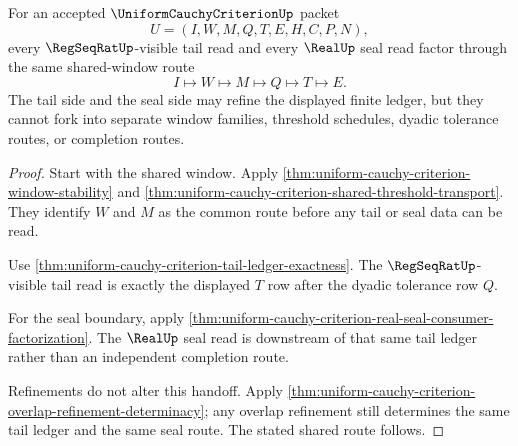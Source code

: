 \begin{theorem}
\label{thm:uniform-cauchy-criterion-finite-family-regseq-real-handoff}
For an accepted $\UniformCauchyCriterionUp$ packet
$$
U=(I,W,M,Q,T,E,H,C,P,N),
$$
every $\RegSeqRatUp$-visible tail read and every $\RealUp$ seal read factor through the same shared-window route
$$
I \longmapsto W \longmapsto M \longmapsto Q \longmapsto T \longmapsto E.
$$
The tail side and the seal side may refine the displayed finite ledger, but they cannot fork into separate window families, threshold schedules, dyadic tolerance routes, or completion routes.
\end{theorem}
\begin{proof}
Start with the shared window. Apply \autoref{thm:uniform-cauchy-criterion-window-stability} and \autoref{thm:uniform-cauchy-criterion-shared-threshold-transport}. They identify $W$ and $M$ as the common route before any tail or seal data can be read.

Use \autoref{thm:uniform-cauchy-criterion-tail-ledger-exactness}. The $\RegSeqRatUp$-visible tail read is exactly the displayed $T$ row after the dyadic tolerance row $Q$.

For the seal boundary, apply \autoref{thm:uniform-cauchy-criterion-real-seal-consumer-factorization}. The $\RealUp$ seal read is downstream of that same tail ledger rather than an independent completion route.

Refinements do not alter this handoff. Apply \autoref{thm:uniform-cauchy-criterion-overlap-refinement-determinacy}; any overlap refinement still determines the same tail ledger and the same seal route. The stated shared route follows.
\end{proof}

